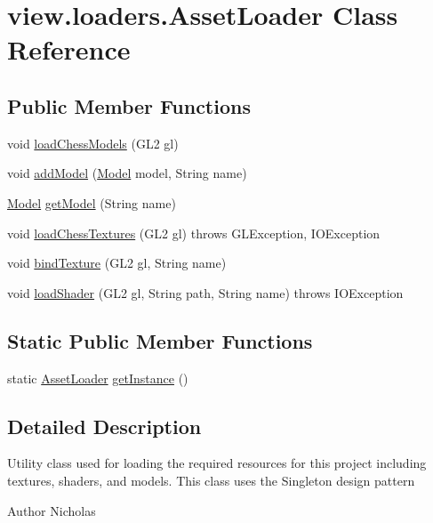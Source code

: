 \hypertarget{classview_1_1loaders_1_1_asset_loader}{\section{view.\-loaders.\-Asset\-Loader Class Reference}
\label{classview_1_1loaders_1_1_asset_loader}
}
\subsection*{Public Member Functions}
\begin{DoxyCompactItemize}
\item 
void \hyperlink{classview_1_1loaders_1_1_asset_loader_af3230113bdf84d76dd268fbcb6deed6e}{load\-Chess\-Models} (G\-L2 gl)
\item 
void \hyperlink{classview_1_1loaders_1_1_asset_loader_af536a1f7b19c6aa4b1848836df715224}{add\-Model} (\hyperlink{classview_1_1loaders_1_1structures_1_1_model}{Model} model, String name)
\item 
\hyperlink{classview_1_1loaders_1_1structures_1_1_model}{Model} \hyperlink{classview_1_1loaders_1_1_asset_loader_a302d4aefd1e5d3ddd6393da2f99fca1b}{get\-Model} (String name)
\item 
void \hyperlink{classview_1_1loaders_1_1_asset_loader_a5a2978cb6e28a04b8ae1fda0dc912a4c}{load\-Chess\-Textures} (G\-L2 gl)  throws G\-L\-Exception, I\-O\-Exception 
\item 
void \hyperlink{classview_1_1loaders_1_1_asset_loader_a091b9979691c6341a486852e98ff7020}{bind\-Texture} (G\-L2 gl, String name)
\item 
void \hyperlink{classview_1_1loaders_1_1_asset_loader_a5bd7d43403033a835784a346ef80aa53}{load\-Shader} (G\-L2 gl, String path, String name)  throws I\-O\-Exception 
\end{DoxyCompactItemize}
\subsection*{Static Public Member Functions}
\begin{DoxyCompactItemize}
\item 
static \hyperlink{classview_1_1loaders_1_1_asset_loader}{Asset\-Loader} \hyperlink{classview_1_1loaders_1_1_asset_loader_a69d45bb647b18f83fc39e1635ff1f813}{get\-Instance} ()
\end{DoxyCompactItemize}


\subsection{Detailed Description}
Utility class used for loading the required resources for this project including textures, shaders, and models. This class uses the Singleton design pattern \begin{DoxyAuthor}{Author}
Nicholas 
\end{DoxyAuthor}


